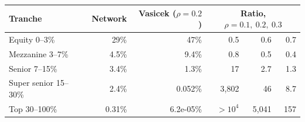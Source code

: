 \begin{tabular}{lrrrrr}
\toprule
Tranche & Network & Vasicek ($\rho=0.2$) & \multicolumn{3}{c}{Ratio, $\rho = 0.1,\ 0.2,\ 0.3$} \\
\midrule
Equity 0--3\% & 29\% & 47\% & 0.5 & 0.6 & 0.7 \\
Mezzanine 3--7\% & 4.5\% & 9.4\% & 0.8 & 0.5 & 0.4 \\
Senior 7--15\% & 3.4\% & 1.3\% & 17 & 2.7 & 1.3 \\
Super senior 15--30\% & 2.4\% & 0.052\% & 3{,}802 & 46 & 8.7 \\
Top 30--100\% & 0.31\% & 6.2e-05\% & $>10^4$ & 5{,}041 & 157 \\
\bottomrule
\end{tabular}
